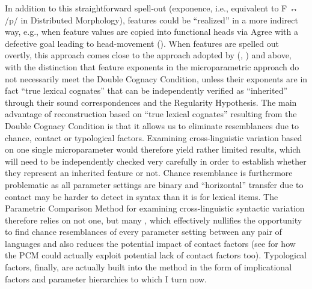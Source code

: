 \documentclass[output=paper,colorlinks,citecolor=brown]{langscibook}
\begin{document}
\largerpage
\noindent In addition to this straightforward spell-out (exponence, i.e., equivalent to F ↔︎ /p/ in Distributed Morphology), features could be “realized” in a more indirect way, e.g., when feature values are copied into functional heads via Agree with a defective goal leading to head-movement (\citealt{mm:roberts2010agreement}). When features are spelled out overtly, this approach comes close to the approach adopted by \citeauthor{mm:walkden_comparative_2009} (\citeyear{mm:walkden_comparative_2009}, \citeyear{mm:Walkden2014}) and \citet{mm:willis_reconstructing_2011} above, with the distinction that feature exponents in the microparametric approach do not necessarily meet the Double Cognacy Condition, unless their exponents are in fact “true lexical cognates” that can be independently verified as “inherited” through their sound correspondences and the Regularity Hypothesis. The main advantage of reconstruction based on “true lexical cognates” resulting from the Double Cognacy Condition is that it allows us to eliminate resemblances due to chance, contact or typological factors. Examining cross-linguistic variation based on one single microparameter would therefore yield rather limited results, which will need to be independently checked very carefully in order to establish whether they represent an inherited feature or not. Chance resemblance is furthermore problematic as all parameter settings are binary and ``horizontal'' transfer due to contact may be harder to detect in syntax than it is for lexical items. The Parametric Comparison Method for examining cross-linguistic syntactic variation therefore relies on not one, but many , which effectively nullifies the opportunity to find chance resemblances of every parameter setting between any pair of languages and also reduces the potential impact of contact factors (see  for how the PCM could actually exploit potential lack of contact factors too). Typological factors, finally, are actually built into the method in the form of implicational factors and parameter hierarchies to which I turn now.
\end{document}
